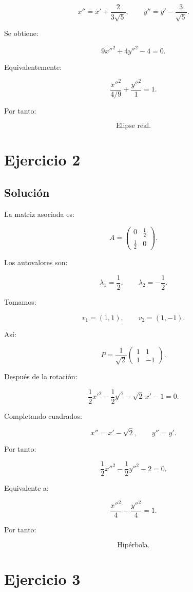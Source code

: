 \documentclass[11pt,a4paper]{article}
\begin{document}
\[
x''=
x'+\frac{2}{3\sqrt5},
\qquad
y''=
y'-\frac{3}{\sqrt5}.
\]

Se obtiene:

\[
\boxed{
9x''^2+4y''^2-4=0.
}
\]

Equivalentemente:

\[
\boxed{
\frac{x''^2}{4/9}
+
\frac{y''^2}{1}
=
1.
}
\]

Por tanto:

\[
\boxed{\text{Elipse real}.}
\]

\section{Ejercicio 2}
\subsection{Solución}

La matriz asociada es:

\[
A=
\begin{pmatrix}
0&\frac12\\
\frac12&0
\end{pmatrix}.
\]

Los autovalores son:

\[
\lambda_1=\frac12,
\qquad
\lambda_2=-\frac12.
\]

Tomamos:

\[
v_1=(1,1),
\qquad
v_2=(1,-1).
\]

Así:

\[
P=
\frac1{\sqrt2}
\begin{pmatrix}
1&1\\
1&-1
\end{pmatrix}.
\]

Después de la rotación:

\[
\frac12x'^2
-
\frac12y'^2
-
\sqrt2\,x'
-1=0.
\]

Completando cuadrados:

\[
x''=x'-\sqrt2,
\qquad
y''=y'.
\]

Por tanto:

\[
\boxed{
\frac12x''^2
-
\frac12y''^2
-2=0.
}
\]

Equivalente a:

\[
\boxed{
\frac{x''^2}{4}
-
\frac{y''^2}{4}
=
1.
}
\]

Por tanto:

\[
\boxed{\text{Hipérbola}.}
\]

\section{Ejercicio 3}
\end{document}
